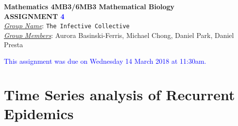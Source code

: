 \documentclass[12pt]{article}\usepackage[]{graphicx}\usepackage[]{color}
\begin{document}
\begin{center}
{\bf Mathematics 4MB3/6MB3 Mathematical Biology\\
 ASSIGNMENT \textcolor{blue}{4}}\\
\medskip
\underline{\emph{Group Name}}: \texttt{{\color{blue}The Infective Collective}}\\
\medskip
\underline{\emph{Group Members}}: {\color{blue}Aurora Basinski-Ferris, Michael Chong, Daniel Park, Daniel Presta}
\end{center}

\bigskip
\noindent
\textcolor{blue}{This assignment was due on Wednesday 14 March 2018 at 11:30am.}

\bigskip

\section{Time Series analysis of Recurrent Epidemics}
\end{document}
